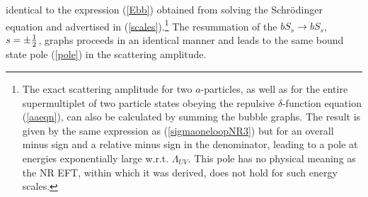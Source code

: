 \documentclass[11pt]{article}
\begin{document}
identical to the expression (\ref{Ebb}) obtained from solving the Schr\" odinger equation and advertised in (\ref{scales}).\footnote{The exact scattering amplitude for two $a$-particles, as well as for the entire  supermultiplet of two particle states obeying the repulsive $\delta$-function equation (\ref{aaeqn}), can also be calculated by summing  the bubble graphs. The result is given by the same expression as (\ref{sigmaoneloopNR3}) but for an overall minus sign and a relative minus sign in the denominator, leading to a pole at energies exponentially large w.r.t. $\Lambda_{UV}$. This pole has no physical meaning as the NR EFT, within which it was derived, does not hold for such energy scales.}
The resummation of the $b S_s \rightarrow b S_s$, $s = \pm {1 \over 2}$, graphs proceeds in an identical manner and leads to the same bound state pole (\ref{pole}) in the scattering amplitude.
\end{document}
